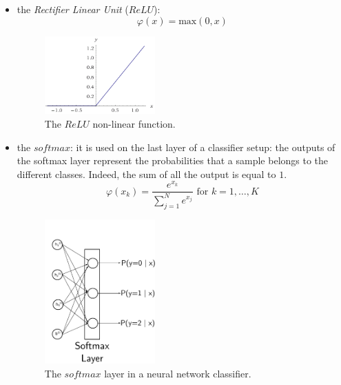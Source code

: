 \begin{itemize}
	\item the \textit{ Rectifier Linear Unit} ($ReLU$):
	\begin{equation}
	\varphi(x) = \text{max}(0,x)
	\end{equation}
	\begin{figure}[t]
		\centering
		\includegraphics[width=0.4\textwidth]{img/relu}
		\caption{The $ReLU$ non-linear function.}
	\end{figure}
	
	\item the $softmax$: it is used on the last layer of a classifier setup: the outputs of the softmax layer represent the probabilities that a sample belongs to the different classes. Indeed, the sum of all the output is equal to $1$.
	\begin{equation}
	\varphi(x_k) = \frac{e^{x_k}}{\sum_{j=1}^{N}e^{x_j}} \text{ for }  k=1,\dots,K
	\end{equation}
	\begin{figure}[t]
		\centering
		\includegraphics[width=0.4\textwidth]{img/softmax}
		\caption{The $\textit{softmax}$ layer in a neural network classifier.}
	\end{figure}	
	
	

\end{itemize}

